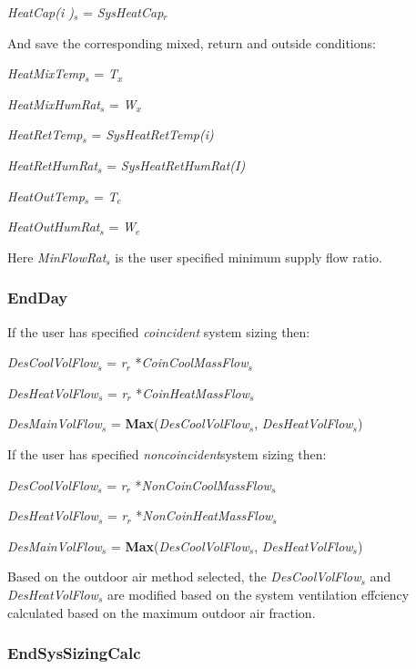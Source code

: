 \emph{HeatCap(i )\(_{s}\)} = \emph{SysHeatCap\(_{r}\)}

And save the corresponding mixed, return and outside conditions:

\emph{HeatMixTemp\(_{s}\)} = \emph{T\(_{x}\)}

\emph{HeatMixHumRat\(_{s}\)} = \emph{W\(_{x}\)}

\emph{HeatRetTemp\(_{s}\)} = \emph{SysHeatRetTemp(i)}

\emph{HeatRetHumRat\(_{s}\)} = \emph{SysHeatRetHumRat(I)}

\emph{HeatOutTemp\(_{s}\)} = \emph{T\(_{e}\)}

\emph{HeatOutHumRat\(_{s}\)} = \emph{W\(_{e}\)}

Here \emph{MinFlowRat\(_{s}\)} is the user specified minimum supply flow ratio.

\subsubsection{EndDay}\label{endday}

If the user has specified \emph{coincident} system sizing then:

\emph{DesCoolVolFlow\(_{s}\)} = \emph{r\(_{r}\)} *\emph{CoinCoolMassFlow\(_{s}\)}

\emph{DesHeatVolFlow\(_{s}\)} = \emph{r\(_{r}\)} *\emph{CoinHeatMassFlow\(_{s}\)}

\emph{DesMainVolFlow\(_{s}\)} = \textbf{Max}(\emph{DesCoolVolFlow\(_{s}\)}, \emph{DesHeatVolFlow\(_{s}\)})

If the user has specified \emph{noncoincident}system sizing then:

\emph{DesCoolVolFlow\(_{s}\)} = \emph{r\(_{r}\)} *\emph{NonCoinCoolMassFlow\(_{s}\)}

\emph{DesHeatVolFlow\(_{s}\)} = \emph{r\(_{r}\)} *\emph{NonCoinHeatMassFlow\(_{s}\)}

\emph{DesMainVolFlow\(_{s}\)} = \textbf{Max}(\emph{DesCoolVolFlow\(_{s}\)}, \emph{DesHeatVolFlow\(_{s}\)})

Based on the outdoor air method selected, the \emph{DesCoolVolFlow\(_{s}\)} and \emph{DesHeatVolFlow\(_{s}\)} are modified based on the system ventilation effciency calculated based on the maximum outdoor air fraction.

\subsubsection{EndSysSizingCalc}\label{endsyssizingcalc}

